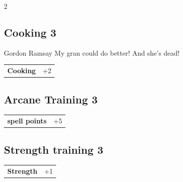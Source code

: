 \begin{multicols}{2}
\begin{tcolorbox}
    \subsection*{Cooking \hfill \small{3 }}
    \tcblower


\begin{pquote}{Gordon Ramsay}
My gran could do better! And she’s dead!
\end{pquote}

\vspace{3mm}

\begin{tabular}{@{}ll@{}}
    \textbf{Cooking} & +2\\
\end{tabular}


\end{tcolorbox}

\begin{tcolorbox}
    \subsection*{Arcane Training \hfill \small{3 }}
    \tcblower




\begin{tabular}{@{}ll@{}}
    \textbf{spell points} & +5\\
\end{tabular}


\end{tcolorbox}

\begin{tcolorbox}
    \subsection*{Strength training \hfill \small{3 }}
    \tcblower




\begin{tabular}{@{}ll@{}}
    \textbf{Strength} & +1\\
\end{tabular}


\end{tcolorbox}
\end{multicols}
